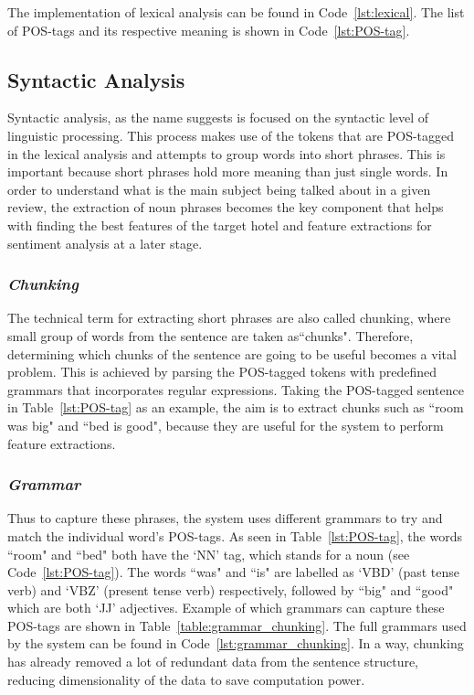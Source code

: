 \documentclass[a4paper]{report}
\begin{document}
\noindent
The implementation of lexical analysis can be found in Code~\ref{lst:lexical}.  The list of POS-tags and its respective meaning is shown in Code~\ref{lst:POS-tag}.

\subsection{Syntactic Analysis}
Syntactic analysis, as the name suggests is focused on the syntactic level of linguistic processing. This process makes use of the tokens that are POS-tagged in the lexical analysis and attempts to group words into short phrases. This is important because short phrases hold more meaning than just single words. In order to understand what is the main subject being talked about in a given review, the extraction of noun phrases becomes the key component that helps with finding the best features of the target hotel and feature extractions for sentiment analysis at a later stage.

\subsubsection{\textit{Chunking}}
The technical term for extracting short phrases are also called chunking, where small group of words from the sentence are taken as``chunks". Therefore, determining which chunks of the sentence are going to be useful becomes a vital problem. This is achieved by parsing the POS-tagged tokens with predefined grammars that incorporates regular expressions. Taking the POS-tagged sentence in Table~\ref{lst:POS-tag} as an example, the aim is to extract chunks such as ``room was big" and ``bed is good", because they are useful for the system to perform feature extractions.

\subsubsection{\textit{Grammar}}
Thus to capture these phrases, the system uses different grammars to try and match the individual word's POS-tags. As seen in Table~\ref{lst:POS-tag}, the words ``room" and ``bed" both have the `NN' tag, which stands for a noun (see Code~\ref{lst:POS-tag}). The words ``was" and ``is" are labelled as `VBD' (past tense verb) and `VBZ' (present tense verb) respectively, followed by ``big" and ``good" which are both `JJ' adjectives. Example of which grammars can capture these POS-tags are shown in Table~\ref{table:grammar_chunking}. The full grammars used by the system can be found in Code~\ref{lst:grammar_chunking}. In a way, chunking has already removed a lot of redundant data from the sentence structure, reducing dimensionality of the data to save computation power. 
\end{document}
